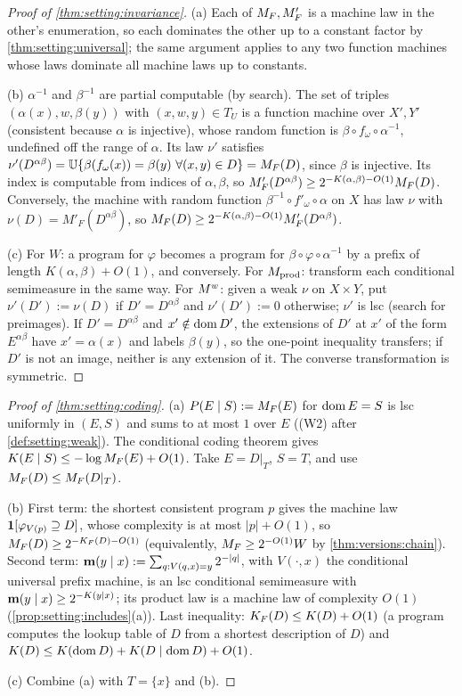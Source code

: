 \begin{proof}[Proof of \cref{thm:setting:invariance}]
(a) Each of $M_{F},M'_F$ is a machine law in the other's enumeration, so each dominates the other up to a constant factor by \cref{thm:setting:universal}; the same argument applies to any two function machines whose laws dominate all machine laws up to constants.

(b) $\alpha^{-1}$ and $\beta^{-1}$ are partial computable (by search). The set of triples $(\alpha(x),w,\beta(y))$ with $(x,w,y)\in T_U$ is a function machine over $X',Y'$ (consistent because $\alpha$ is injective), whose random function is $\beta\circ f_\omega\circ\alpha^{-1}$, undefined off the range of $\alpha$. Its law $\nu'$ satisfies $\nu'(D^{\alpha\beta})=\Unif\{\beta(f_\omega(x))=\beta(y)\ \forall(x,y)\in D\}=\MF(D)$, since $\beta$ is injective. Its index is computable from indices of $\alpha,\beta$, so $M'_F(D^{\alpha\beta})\ge2^{-K(\alpha,\beta)-O(1)}M_{F}(D)$. Conversely, the machine with random function $\beta^{-1}\circ f'_\omega\circ\alpha$ on $X$ has law $\nu$ with $\nu(D)=M'_F(D^{\alpha\beta})$, so $M_{F}(D)\ge2^{-K(\alpha,\beta)-O(1)}M'_F(D^{\alpha\beta})$.

(c) For $W$: a program for $\varphi$ becomes a program for $\beta\circ\varphi\circ\alpha^{-1}$ by a prefix of length $K(\alpha,\beta)+O(1)$, and conversely. For $M_{\mathrm{prod}}$: transform each conditional semimeasure in the same way. For $M^{w}$: given a weak $\nu$ on $X\times Y$, put $\nu'(D'):=\nu(D)$ if $D'=D^{\alpha\beta}$ and $\nu'(D'):=0$ otherwise; $\nu'$ is lsc (search for preimages). If $D'=D^{\alpha\beta}$ and $x'\notin\operatorname{dom} D'$, the extensions of $D'$ at $x'$ of the form $E^{\alpha\beta}$ have $x'=\alpha(x)$ and labels $\beta(y)$, so the one-point inequality transfers; if $D'$ is not an image, neither is any extension of it. The converse transformation is symmetric.
\end{proof}

\begin{proof}[Proof of \cref{thm:setting:coding}]
(a) $P(E\mid S):=M_{F}(E)$ for $\operatorname{dom} E=S$ is lsc uniformly in $(E,S)$ and sums to at most $1$ over $E$ ((W2) after \cref{def:setting:weak}). The conditional coding theorem gives $K(E\mid S)\le-\log M_{F}(E)+O(1)$. Take $E=D|_T$, $S=T$, and use $M_{F}(D)\le M_{F}(D|_T)$.

(b) First term: the shortest consistent program $p$ gives the machine law $\mathbf{1}[\varphi_{V(p)}\supseteq D]$, whose complexity is at most $|p|+O(1)$, so $M_{F}(D)\ge2^{-K_{F}(D)-O(1)}$ (equivalently, $M_{F}\ge2^{-O(1)}W$ by \cref{thm:versions:chain}). Second term: $\mathbf{m}(y\mid x):=\sum_{q:V(q,x)=y}2^{-|q|}$, with $V(\cdot,x)$ the conditional universal prefix machine, is an lsc conditional semimeasure with $\mathbf{m}(y\mid x)\ge2^{-K(y\mid x)}$; its product law is a machine law of complexity $O(1)$ (\cref{prop:setting:includes}(a)). Last inequality: $K_{F}(D)\le K(D)+O(1)$ (a program computes the lookup table of $D$ from a shortest description of $D$) and $K(D)\le K(\operatorname{dom} D)+K(D\mid\operatorname{dom} D)+O(1)$.

(c) Combine (a) with $T=\{x\}$ and (b).
\end{proof}

